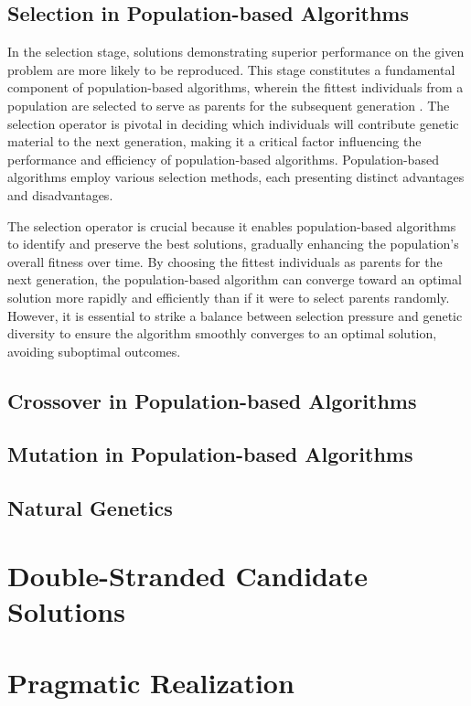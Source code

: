 \documentclass[runningheads]{llncs}
\begin{document}
\subsection{Selection in Population-based Algorithms}

In the selection stage, solutions demonstrating superior performance on the given problem are more likely to be reproduced. This stage constitutes a fundamental component of population-based algorithms, wherein the fittest individuals from a population are selected to serve as parents for the subsequent generation \cite{Miller-1996}. The selection operator is pivotal in deciding which individuals will contribute genetic material to the next generation, making it a critical factor influencing the performance and efficiency of population-based algorithms. Population-based algorithms employ various selection methods, each presenting distinct advantages and disadvantages.

The selection operator is crucial because it enables population-based algorithms to identify and preserve the best solutions, gradually enhancing the population's overall fitness over time. By choosing the fittest individuals as parents for the next generation, the population-based algorithm can converge toward an optimal solution more rapidly and efficiently than if it were to select parents randomly. However, it is essential to strike a balance between selection pressure and genetic diversity to ensure the algorithm smoothly converges to an optimal solution, avoiding suboptimal outcomes.

\subsection{Crossover in Population-based Algorithms}

\subsection{Mutation in Population-based Algorithms}

\subsection{Natural Genetics}

\section{Double-Stranded Candidate Solutions}

\section{Pragmatic Realization}
\end{document}
